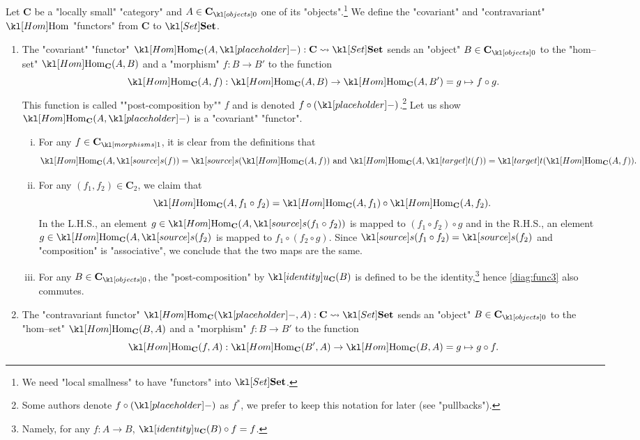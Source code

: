 \documentclass[main.tex]{subfiles}
\begin{document}
\begin{exmp}\label{exmp:homfunctor}
	Let $\mathbf{C}$ be a "locally small" "category" and $A \in \obj{\mathbf{C}}$ one of its "objects".\footnote{We need "local smallness" to have "functors" into $\catSet$.} We define the "covariant" and "contravariant" $\Hom$ "functors" from $\mathbf{C}$ to $\catSet$.
	\begin{enumerate}
		\item The "covariant" "functor" $\Hom_{\mathbf{C}}(A,\placeholder): \mathbf{C} \rightsquigarrow \catSet$ sends an "object" $B\in \obj{\mathbf{C}}$ to the "hom--set" $\Hom_{\mathbf{C}}(A,B)$ and a "morphism" $f:B\rightarrow B'$ to the function \[\Hom_{\mathbf{C}}(A,f): \Hom_{\mathbf{C}}(A,B) \rightarrow \Hom_{\mathbf{C}}(A,B') = g \mapsto f\circ g.\]
		\AP This function is called ""post-composition by"" $f$ and is denoted $f \circ (\placeholder)$.\footnote{Some authors denote $f \circ (\placeholder)$ as $f^*$, we prefer to keep this notation for later (see "pullbacks").} Let us show $\Hom_{\mathbf{C}}(A, \placeholder)$ is a "covariant" "functor".
		\begin{enumerate}[i.]
			\item For any $f \in \mor{\mathbf{C}}$, it is clear from the definitions that \[\Hom_{\mathbf{C}}(A,\source(f)) = \source(\Hom_{\mathbf{C}}(A,f)) \text{ and } \Hom_{\mathbf{C}}(A,\target(f)) = \target(\Hom_{\mathbf{C}}(A,f)).\]
			\item For any $(f_1,f_2) \in \mathbf{C}_2$, we claim that \[\Hom_{\mathbf{C}}(A,f_1\circ f_2) = \Hom_{\mathbf{C}}(A,f_1)\circ \Hom_{\mathbf{C}}(A,f_2).\] In the L.H.S., an element $g \in \Hom_{\mathbf{C}}(A,\source(f_1\circ f_2))$ is mapped to $(f_1 \circ f_2) \circ g$ and in the R.H.S., an element $g \in \Hom_{\mathbf{C}}(A,\source(f_2)$ is mapped to $f_1\circ (f_2 \circ g)$. Since $\source(f_1 \circ f_2) = \source(f_2)$ and "composition" is "associative", we conclude that the two maps are the same.
			\item For any $B \in \obj{\mathbf{C}}$, the "post-composition" by $\idu_{\mathbf{C}}(B)$ is defined to be the identity,\footnote{Namely, for any $f: A \rightarrow B$, $\idu_{\mathbf{C}}(B) \circ f = f$.} hence \eqref{diag:func3} also commutes.
		\end{enumerate}
		\item The "contravariant functor" $\Hom_{\mathbf{C}}(\placeholder,A): \mathbf{C} \rightsquigarrow \catSet$ sends an "object" $B\in \obj{\mathbf{C}}$ to the "hom--set" $\Hom_{\mathbf{C}}(B,A)$ and a "morphism" $f:B\rightarrow B'$ to the function \[\Hom_{\mathbf{C}}(f,A): \Hom_{\mathbf{C}}(B',A) \rightarrow \Hom_{\mathbf{C}}(B,A) = g \mapsto g\circ f.\]

\end{enumerate}
\end{exmp}
\end{document}
